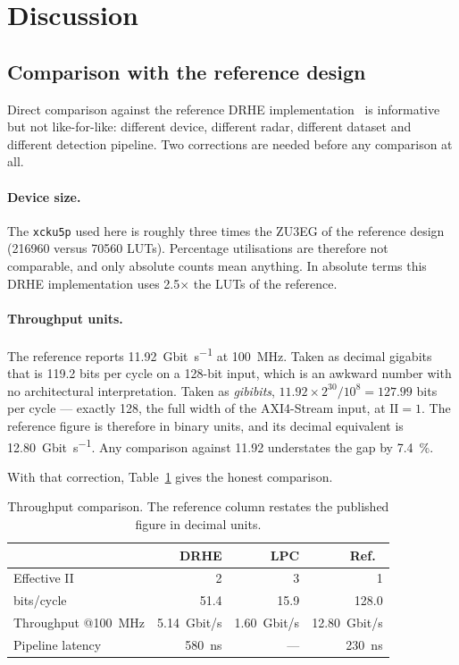 \documentclass[10pt,twocolumn]{article}
\begin{document}
\section{Discussion}
\label{sec:discussion}

\subsection{Comparison with the reference design}

Direct comparison against the reference DRHE implementation~\cite{kiem2023} is
informative but not like-for-like: different device, different radar, different
dataset and different detection pipeline. Two corrections are needed before any
comparison at all.

\paragraph{Device size.}
The \texttt{xcku5p} used here is roughly three times the ZU3EG of the reference
design (\num{216960} versus \num{70560} LUTs). Percentage utilisations are
therefore not comparable, and only absolute counts mean anything. In absolute
terms this DRHE implementation uses \num{2.5}$\times$ the LUTs of the
reference.

\paragraph{Throughput units.}
The reference reports \SI{11.92}{Gbit\per\second} at \SI{100}{\mega\hertz}.
Taken as decimal gigabits that is \num{119.2} bits per cycle on a 128-bit
input, which is an awkward number with no architectural interpretation. Taken
as \emph{gibibits}, $11.92 \times 2^{30} / 10^{8} = 127.99$ bits per cycle ---
exactly \num{128}, the full width of the AXI4-Stream input, at
$\mathrm{II}=1$. The reference figure is therefore in binary units, and its
decimal equivalent is \SI{12.80}{Gbit\per\second}. Any comparison against
\num{11.92} understates the gap by \SI{7.4}{\percent}.

With that correction, Table~\ref{tab:throughput} gives the honest comparison.

\begin{table}[t]
\centering
\caption{Throughput comparison. The reference column restates the published
figure in decimal units.}
\label{tab:throughput}
\small
\setlength{\tabcolsep}{4pt}
\begin{tabular}{lrrr}
\toprule
& DRHE & LPC & Ref.~\cite{kiem2023}\\
\midrule
Effective II            & 2   & 3   & 1\\
bits/cycle              & 51.4 & 15.9 & 128.0\\
Throughput @\SI{100}{\mega\hertz} & \SI{5.14}{Gbit/s} & \SI{1.60}{Gbit/s} & \SI{12.80}{Gbit/s}\\
Pipeline latency        & \SI{580}{\nano\second} & --- & \SI{230}{\nano\second}\\
\bottomrule
\end{tabular}
\end{table}
\end{document}
